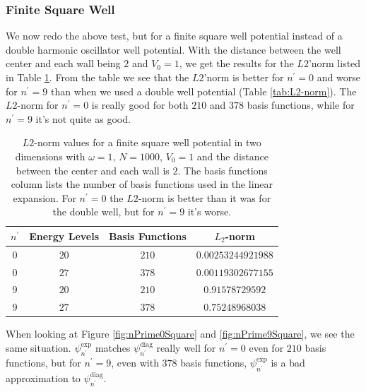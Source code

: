 \documentclass[../main.tex]{subfiles}
\begin{document}
\subsubsection{Finite Square Well}
We now redo the above test, but for a finite square well potential instead of a double harmonic oscillator well potential. With the distance between the well center and each wall being $2$ and $V_0 = 1$, we get the results for the $L2$'norm listed in Table \ref{tab:L2-norm Square}. From the table we see that the $L2$'norm is better for $n^\prime = 0$ and worse for $n^\prime = 9$ than when we used a double well potential (Table \ref{tab:L2-norm}). The $L2$-norm for $n^\prime = 0$ is really good for both $210$ and $378$ basis functions, while for $n^\prime = 9$ it's not quite as good.
\begin{table}[!ht]
  \centering
  \begin{tabular}{ | c | c | c | c | }
    \hline
    $n^\prime$ & Energy Levels & Basis Functions & $L_2$-norm\\*
    \hline
    $0$ & $20$ & $210$ & $0.00253244921988$
    \\*
    \hline
    $0$ & $27$ & $378$ & $0.00119302677155$
    \\*
    \hline
    $9$ & $20$ & $210$ & $0.91578729592$
    \\*
    \hline
    $9$ & $27$ & $378$ & $0.75248968038$
    \\*
    \hline
  \end{tabular}
  \caption{$L2$-norm values for a finite square well potential in two dimensions with $\omega = 1$, $N = 1000$, $V_0 = 1$ and the distance between the center and each wall is $2$. The basis functions column lists the number of basis functions used in the linear expansion. For $n^\prime = 0$ the $L2$-norm is better than it was for the double well, but for $n^\prime = 9$ it's worse.}
  \label{tab:L2-norm Square}
\end{table}

When looking at Figure \ref{fig:nPrime0Square} and \ref{fig:nPrime9Square}, we see the same situation. $\psi_{n^\prime}^\textrm{exp}$ matches $\psi_{n^\prime}^\textrm{diag}$ really well for $n^\prime = 0$ even for $210$ basis functions, but for $n^\prime = 9$, even with $378$ basis functions, $\psi_{n^\prime}^\textrm{exp}$ is a bad approximation to $\psi_{n^\prime}^\textrm{diag}$.
\end{document}
